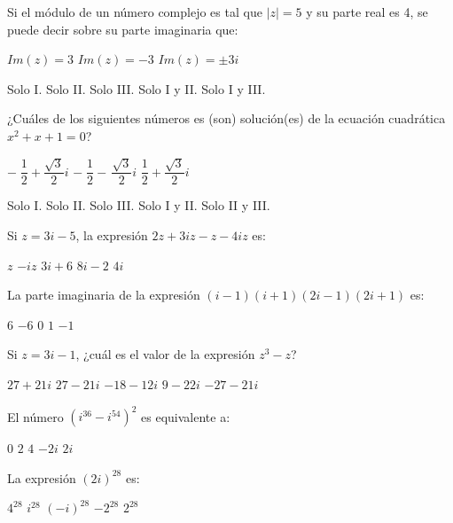\documentclass[]{srs}
\begin{document}
\begin{preguntas}[after-item-skip=2cm]
\pregunta Si el módulo de un número complejo es tal que $|z|=5$ y su parte real es 4,
se puede decir sobre su parte imaginaria que:\\
\begin{vertical*}
  \alternativa $Im(z)=3$
  \alternativa $Im(z)=-3$
  \alternativa $Im(z)=\pm 3i$
\end{vertical*}
\begin{vertical}
  \alternativa Solo I.
  \alternativa Solo II.
  \alternativa Solo III.
  \alternativa Solo I y II.
  \alternativa Solo I y III.
\end{vertical}

\pregunta ¿Cuáles de los siguientes números es (son) solución(es) de la ecuación
cuadrática $x^2+x+1=0$?\\
\begin{vertical*}
  \alternativa $-\;\dfrac{1}{2}+\dfrac{\sqrt{3}}{2}i$
  \alternativa $-\;\dfrac{1}{2}-\,\dfrac{\sqrt{3}}{2}i$
  \alternativa $\dfrac{1}{2}+\dfrac{\sqrt{3}}{2}i$
\end{vertical*}
\begin{vertical}
  \alternativa Solo I.
  \alternativa Solo II.
  \alternativa Solo III.
  \alternativa Solo I y II.
  \alternativa Solo II y III.
\end{vertical}

\pregunta Si $z=3i-5$, la expresión $2z+3iz-z-4iz$ es:\\
\begin{vertical}
  \alternativa $z$
  \alternativa $-iz$
  \alternativa $3i+6$
  \alternativa $8i-2$
  \alternativa $4i$
\end{vertical}

\pregunta La parte imaginaria de la expresión
$(i-1)(i+1)(2i-1)(2i+1)$ es:\\
\begin{vertical}
\alternativa $6$
\alternativa $-6$
\alternativa $0$
\alternativa $1$
\alternativa $-1$
\end{vertical}

\pregunta Si $z=3i-1$, ¿cuál es el valor de la
expresión $z^3-z$?\\
\begin{vertical}
  \alternativa $27+21i$
  \alternativa $27-21i$
  \alternativa $-18-12i$
  \alternativa $9-22i$
  \alternativa $-27-21i$
\end{vertical}


\pregunta El número $(i^{36}-i^{54})^2$ es equivalente a:\\
\begin{vertical}
  \alternativa $0$
  \alternativa $2$
  \alternativa $4$
  \alternativa $-2i$
  \alternativa $2i$
\end{vertical}

\pregunta La expresión $(2i)^{28}$ es:\\
\begin{vertical}
  \alternativa $4^{28}$
  \alternativa $i^{28}$
  \alternativa $(-i)^{28}$
  \alternativa $-2^{28}$
  \alternativa $2^{28}$
\end{vertical}

\end{preguntas}
\end{document}

